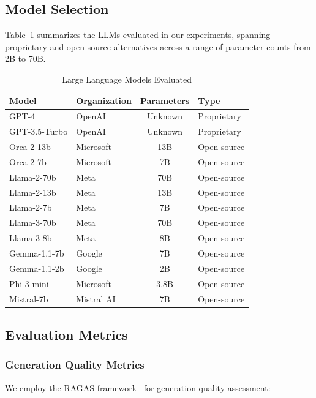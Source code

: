 \subsection{Model Selection}

Table~\ref{tab:models_evaluated} summarizes the LLMs evaluated in our experiments, spanning proprietary and open-source alternatives across a range of parameter counts from 2B to 70B.

\begin{table}[htbp]
\centering
\caption{Large Language Models Evaluated}
\label{tab:models_evaluated}
\begin{tabular}{@{}llcl@{}}
\toprule
\textbf{Model} & \textbf{Organization} & \textbf{Parameters} & \textbf{Type} \\
\midrule
GPT-4 & OpenAI & Unknown & Proprietary \\
GPT-3.5-Turbo & OpenAI & Unknown & Proprietary \\
Orca-2-13b & Microsoft & 13B & Open-source \\
Orca-2-7b & Microsoft & 7B & Open-source \\
Llama-2-70b & Meta & 70B & Open-source \\
Llama-2-13b & Meta & 13B & Open-source \\
Llama-2-7b & Meta & 7B & Open-source \\
Llama-3-70b & Meta & 70B & Open-source \\
Llama-3-8b & Meta & 8B & Open-source \\
Gemma-1.1-7b & Google & 7B & Open-source \\
Gemma-1.1-2b & Google & 2B & Open-source \\
Phi-3-mini & Microsoft & 3.8B & Open-source \\
Mistral-7b & Mistral AI & 7B & Open-source \\
\bottomrule
\end{tabular}
\end{table}

\subsection{Evaluation Metrics}

\subsubsection{Generation Quality Metrics}

We employ the RAGAS framework~\cite{es2023ragas} for generation quality assessment:

